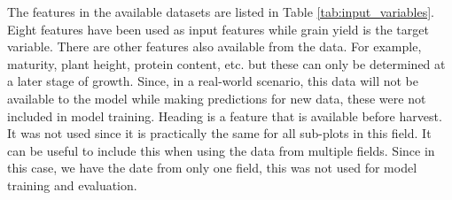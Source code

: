 \documentclass[sigconf, nonacm, natbib, screen, balance=False]{acmart}
\begin{document}
The features in the available datasets are listed in Table \ref{tab:input_variables}. Eight features have been used as input features while grain yield is the target variable. There are other features also available from the data. For example, maturity, plant height, protein content, etc. but these can only be determined at a later stage of growth. Since, in a real-world scenario, this data will not be available to the model while making predictions for new data, these were not included in model training. Heading is a feature that is available before harvest. It was not used since it is practically the same for all sub-plots in this field. It can be useful to include this when using the data from multiple fields. Since in this case, we have the date from only one field, this was not used for model training and evaluation.
\end{document}
